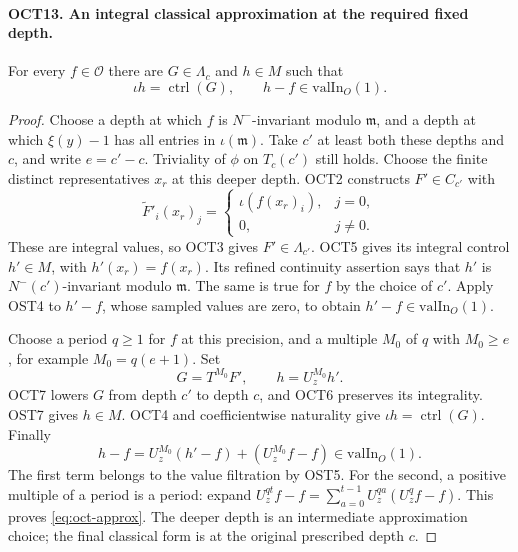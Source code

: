 \documentclass[11pt,a4paper]{article}
\numberwithin{equation}{section}
\theoremstyle{remark}\newtheorem{remark}[theorem]{Remark}
\begin{document}
\paragraph{OCT13. An integral classical approximation at the required fixed depth.}
\label{claim:OCT13}
For every $f\in\mathcal O$ there are
$G\in\Lambda_c$ and $h\in M$ such that
\begin{equation}\label{eq:oct-approx}
 \iota h=\operatorname{ctrl}(G),\qquad
                         h-f\in\mathrm{valIn}_O(1).
\end{equation}
\begin{proof}
Choose a depth at which $f$ is $N^-$-invariant modulo
$\mathfrak m$, and a depth at which $\xi(y)-1$ has all
entries in $\iota(\mathfrak m)$.  Take $c'$ at least both
these depths and $c$, and write $e=c'-c$.  Triviality of
$\phi$ on $T_c(c')$ still holds.  Choose the finite distinct
representatives $x_r$ at this deeper depth.  OCT2 constructs
$F'\in C_{c'}$ with
\[
      \widetilde F'_i(x_r)_j=
          \begin{cases}\iota(f(x_r)_i),&j=0,\\0,&j\ne0.
          \end{cases}
\]
These are integral values, so OCT3 gives $F'\in\Lambda_{c'}$.
OCT5 gives its integral control $h'\in M$, with
$h'(x_r)=f(x_r)$.  Its refined continuity assertion says
that $h'$ is $N^-(c')$-invariant modulo $\mathfrak m$.
The same is true for $f$ by the choice of $c'$.  Apply
OST4 to $h'-f$, whose sampled values are zero, to obtain
$h'-f\in\mathrm{valIn}_O(1)$.

Choose a period $q\geq1$ for $f$ at this precision, and a
multiple $M_0$ of $q$ with $M_0\geq e$, for example
$M_0=q(e+1)$.  Set
\[
                         G=T^{M_0}F',\qquad h=U_z^{M_0}h'.
\]
OCT7 lowers $G$ from depth $c'$ to depth $c$, and OCT6
preserves its integrality.  OST7 gives $h\in M$.
OCT4 and coefficientwise naturality give
$\iota h=\operatorname{ctrl}(G)$.  Finally
\[
 h-f=U_z^{M_0}(h'-f)+(U_z^{M_0}f-f)
                                             \in\mathrm{valIn}_O(1).
\]
The first term belongs to the value filtration by OST5.
For the second, a positive multiple of a period is a
period: expand
$U_z^{qt}f-f=\sum_{a=0}^{t-1}U_z^{qa}(U_z^qf-f)$.
This proves \eqref{eq:oct-approx}.  The deeper depth is an
intermediate approximation choice; the final classical form
is at the original prescribed depth $c$.
\end{proof}

\end{document}
